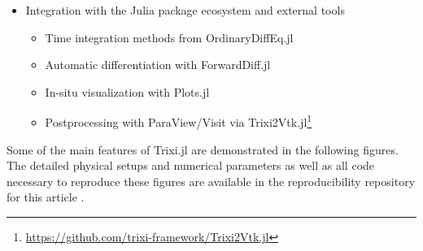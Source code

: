 \documentclass[hidelinks]{juliacon} %
\newcommand{\trixi}{Trixi.jl\xspace}
\begin{document}
\begin{itemize}
  \item Integration with the Julia package ecosystem and external tools
  \begin{itemize}
    \item Time integration methods from OrdinaryDiffEq.jl
    \item Automatic differentiation with ForwardDiff.jl
    \item In-situ visualization with Plots.jl
    \item Postprocessing with ParaView/Visit via Trixi2Vtk.jl\footnote{\url{https://github.com/trixi-framework/Trixi2Vtk.jl}}
  \end{itemize}
\end{itemize}

Some of the main features of \trixi are demonstrated in the following figures.
The detailed physical setups and numerical parameters as well as all code
necessary to reproduce these figures are available in the reproducibility
repository for this article \cite{ranocha2021adaptiveRepro}.
\end{document}
